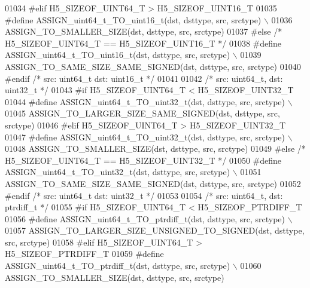 \begin{DoxyCode}
01034 \textcolor{preprocessor}{#elif H5\_SIZEOF\_UINT64\_T > H5\_SIZEOF\_UINT16\_T}
01035 \textcolor{preprocessor}{    #define ASSIGN\_uint64\_t\_TO\_uint16\_t(dst, dsttype, src, srctype) \(\backslash\)}
01036 \textcolor{preprocessor}{        ASSIGN\_TO\_SMALLER\_SIZE(dst, dsttype, src, srctype)}
01037 \textcolor{preprocessor}{#else }\textcolor{comment}{/* H5\_SIZEOF\_UINT64\_T == H5\_SIZEOF\_UINT16\_T */}\textcolor{preprocessor}{}
01038 \textcolor{preprocessor}{    #define ASSIGN\_uint64\_t\_TO\_uint16\_t(dst, dsttype, src, srctype) \(\backslash\)}
01039 \textcolor{preprocessor}{        ASSIGN\_TO\_SAME\_SIZE\_SAME\_SIGNED(dst, dsttype, src, srctype)}
01040 \textcolor{preprocessor}{#endif }\textcolor{comment}{/* src: uint64\_t dst: uint16\_t */}\textcolor{preprocessor}{}
01041 
01042 \textcolor{comment}{/* src: uint64\_t, dst: uint32\_t */}
01043 \textcolor{preprocessor}{#if H5\_SIZEOF\_UINT64\_T < H5\_SIZEOF\_UINT32\_T}
01044 \textcolor{preprocessor}{    #define ASSIGN\_uint64\_t\_TO\_uint32\_t(dst, dsttype, src, srctype) \(\backslash\)}
01045 \textcolor{preprocessor}{        ASSIGN\_TO\_LARGER\_SIZE\_SAME\_SIGNED(dst, dsttype, src, srctype)}
01046 \textcolor{preprocessor}{#elif H5\_SIZEOF\_UINT64\_T > H5\_SIZEOF\_UINT32\_T}
01047 \textcolor{preprocessor}{    #define ASSIGN\_uint64\_t\_TO\_uint32\_t(dst, dsttype, src, srctype) \(\backslash\)}
01048 \textcolor{preprocessor}{        ASSIGN\_TO\_SMALLER\_SIZE(dst, dsttype, src, srctype)}
01049 \textcolor{preprocessor}{#else }\textcolor{comment}{/* H5\_SIZEOF\_UINT64\_T == H5\_SIZEOF\_UINT32\_T */}\textcolor{preprocessor}{}
01050 \textcolor{preprocessor}{    #define ASSIGN\_uint64\_t\_TO\_uint32\_t(dst, dsttype, src, srctype) \(\backslash\)}
01051 \textcolor{preprocessor}{        ASSIGN\_TO\_SAME\_SIZE\_SAME\_SIGNED(dst, dsttype, src, srctype)}
01052 \textcolor{preprocessor}{#endif }\textcolor{comment}{/* src: uint64\_t dst: uint32\_t */}\textcolor{preprocessor}{}
01053 
01054 \textcolor{comment}{/* src: uint64\_t, dst: ptrdiff\_t */}
01055 \textcolor{preprocessor}{#if H5\_SIZEOF\_UINT64\_T < H5\_SIZEOF\_PTRDIFF\_T}
01056 \textcolor{preprocessor}{    #define ASSIGN\_uint64\_t\_TO\_ptrdiff\_t(dst, dsttype, src, srctype) \(\backslash\)}
01057 \textcolor{preprocessor}{        ASSIGN\_TO\_LARGER\_SIZE\_UNSIGNED\_TO\_SIGNED(dst, dsttype, src, srctype)}
01058 \textcolor{preprocessor}{#elif H5\_SIZEOF\_UINT64\_T > H5\_SIZEOF\_PTRDIFF\_T}
01059 \textcolor{preprocessor}{    #define ASSIGN\_uint64\_t\_TO\_ptrdiff\_t(dst, dsttype, src, srctype) \(\backslash\)}
01060 \textcolor{preprocessor}{        ASSIGN\_TO\_SMALLER\_SIZE(dst, dsttype, src, srctype)}

\end{DoxyCode}

